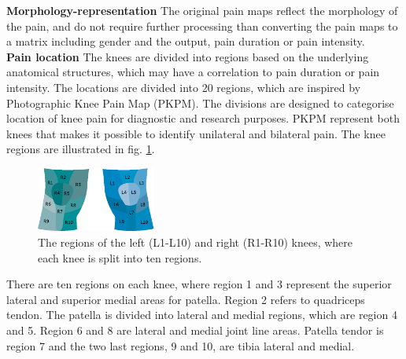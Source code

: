 \noindent
\textbf{Morphology-representation} \newline
\noindent
The original pain maps reflect the morphology of the pain, and do not require further processing than converting the pain maps to a matrix including gender and the output, pain duration or pain intensity.\\


\noindent
\textbf{Pain location} \newline
\noindent
The knees are divided into regions based on the underlying anatomical structures, which may have a correlation to pain duration or pain intensity.
The locations are divided into 20 regions, which are inspired by Photographic Knee Pain Map (PKPM). The divisions are designed to categorise location of knee pain for diagnostic and research purposes. PKPM represent both knees that makes it possible to identify unilateral and bilateral pain.\citep{Elson2010} The knee regions are illustrated in fig. \ref{fig:atlas}.

\begin{figure} [H] 
\centering
\includegraphics[width=0.35\textwidth]{Figures/atlas}
\caption{The regions of the left (L1-L10) and right (R1-R10) knees, where each knee is split into ten regions.}
\label{fig:atlas}
\end{figure}

\noindent 
There are ten regions on each knee, where region 1 and 3 represent the superior lateral and superior medial areas for patella. Region 2 refers to quadriceps tendon. The patella is divided into lateral and medial regions, which are region 4 and 5. Region 6 and 8 are lateral and medial joint line areas. Patella tendor is region 7 and the two last regions, 9 and 10, are tibia lateral and medial.\citep{Elson2010}\\


